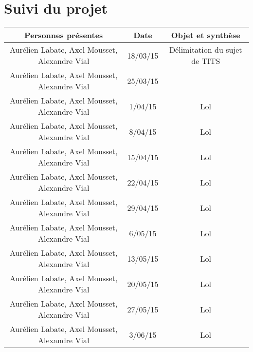 \chapter{Suivi du projet}
    \begin{tabular}{|c|c|c|}
        \hline
        Personnes présentes & Date & Objet et synthèse\\
        \hline
        \hline
        Aurélien Labate, Axel Mousset, Alexandre Vial & 18/03/15 & Délimitation du sujet de TITS\\
        \hline
        Aurélien Labate, Axel Mousset, Alexandre Vial & 25/03/15 & \\
        \hline
        Aurélien Labate, Axel Mousset, Alexandre Vial & 1/04/15 & Lol\\
        \hline
        Aurélien Labate, Axel Mousset, Alexandre Vial & 8/04/15 & Lol\\
        \hline
        Aurélien Labate, Axel Mousset, Alexandre Vial & 15/04/15 & Lol\\
        \hline
        Aurélien Labate, Axel Mousset, Alexandre Vial & 22/04/15 & Lol\\
        \hline
        Aurélien Labate, Axel Mousset, Alexandre Vial & 29/04/15 & Lol\\
        \hline
        Aurélien Labate, Axel Mousset, Alexandre Vial & 6/05/15 & Lol\\
        \hline
        Aurélien Labate, Axel Mousset, Alexandre Vial & 13/05/15 & Lol\\
        \hline
        Aurélien Labate, Axel Mousset, Alexandre Vial & 20/05/15 & Lol\\
        \hline
        Aurélien Labate, Axel Mousset, Alexandre Vial & 27/05/15 & Lol\\
        \hline
        Aurélien Labate, Axel Mousset, Alexandre Vial & 3/06/15 & Lol\\
        \hline
     \end{tabular}